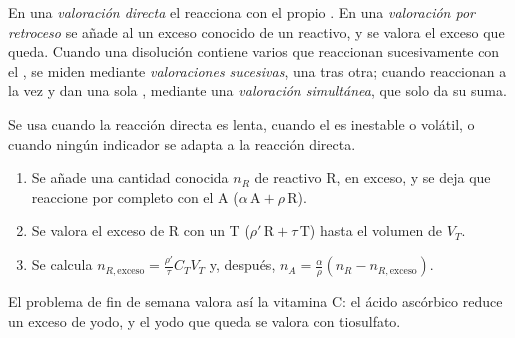 \begin{definition}\label{def:b1:titration-methods:kinds}
En una \emph{valoración directa} el  reacciona
con el propio . En una \emph{valoración por
retroceso} se añade al  un exceso
conocido de un reactivo, y se valora el exceso que queda. Cuando una
disolución contiene varios  que reaccionan sucesivamente con el
, se miden mediante \emph{valoraciones
sucesivas}, una  tras otra;
cuando reaccionan a la vez y dan una sola , mediante una
\emph{valoración simultánea}, que solo da su suma.
\end{definition}

\begin{method}\label{met:b1:titration-methods:back-titration}
Se usa cuando la reacción directa es lenta, cuando el  es
inestable o volátil, o cuando ningún indicador se adapta a la reacción
directa.
\begin{enumerate}
  \item Se añade una cantidad conocida $n_R$ de reactivo R, en exceso, y se
        deja que reaccione por completo con el  A
        ($\alpha\,\mathrm{A} + \rho\,\mathrm{R}$).
  \item Se valora el exceso de R con un  T ($\rho'\,\mathrm{R} +
        \tau\,\mathrm{T}$) hasta el volumen de  $V_T$.
  \item Se calcula $n_{R,\text{exceso}} = \frac{\rho'}{\tau}C_TV_T$ y, después,
        $n_A = \frac{\alpha}{\rho}(n_R - n_{R,\text{exceso}})$.
\end{enumerate}
\end{method}

El problema de fin de semana valora así la vitamina C: el ácido ascórbico
reduce un exceso de yodo, y el yodo que queda se valora con tiosulfato.

